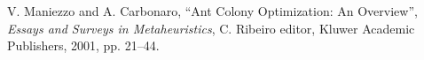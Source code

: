 \documentclass[11pt]{article}
\begin{document}
\begin{thebibliography}{99}











V. Maniezzo and A. Carbonaro,
``Ant Colony Optimization: An Overview'', {\it Essays and Surveys in
Metaheuristics}, C. Ribeiro editor, Kluwer Academic Publishers, 2001, pp.
21--44.





\end{thebibliography}
\end{document}
